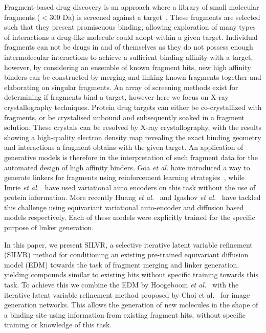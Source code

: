 \documentclass[journal=jacsat,manuscript=article]{achemso}
\begin{document}
Fragment-based drug discovery is an approach where a library of small molecular fragments ($<$300 Da) is screened against a target~\cite{hajduk2007decade, kumar2012fragment, bian2018computational}. These fragments are selected such that they present promiscuous binding, allowing exploration of many types of interactions a drug-like molecule could adopt within a given target. Individual fragments can not be drugs in and of themselves as they do not possess enough intermolecular interactions to achieve a sufficient binding affinity with a target, however, by considering an ensemble of known fragment hits, new high affinity binders can be constructed by merging and linking known fragments together and elaborating on singular fragments. An array of screening methods exist for determining if fragments bind a target, however here we focus on X-ray crystallography techniques. Protein drug targets can either be co-crystallized with fragments, or be crystalised unbound and subsequently soaked in a fragment solution. These crystals can be resolved by X-ray crystallography, with the results showing a high-quality electron density map revealing the exact binding geometry and interactions a fragment obtains with the given target. 
An application of generative models is therefore in the interpretation of such fragment data for the automated design of high affinity binders. Goa \textit{et al.} have introduced a way to generate linkers for fragments using reinforcement learning strategies~\cite{guo2023linkinvent}, while Imrie \textit{et al.}~\cite{imrie2020deep} have used variational auto encoders on this task without the use of protein information. More recently Huang \textit{et al.}~\cite{huang20223dlinker} and Igashov \textit{et al.}~\cite{igashov2022equivariant} have tackled this challenge using equivariant variational auto-encoder and diffusion based models respectively. Each of these models were explicitly trained for the specific purpose of linker generation.  

In this paper, we present SILVR, a selective iterative latent variable refinement (SILVR) method for conditioning an existing pre-trained equivariant diffusion model (EDM) towards the task of fragment merging and linker generation, yielding compounds similar to existing hits without specific training towards this task. To achieve this we combine the EDM by Hoogeboom \textit{et al.}~\cite{hoogeboom2022equivariant} with the iterative latent variable refinement method proposed by Choi et al.~\cite{choi2021ilvr} for image generation networks. This allows the generation of new molecules in the shape of a binding site using information from existing fragment hits, without specific training or knowledge of this task. 
\end{document}
